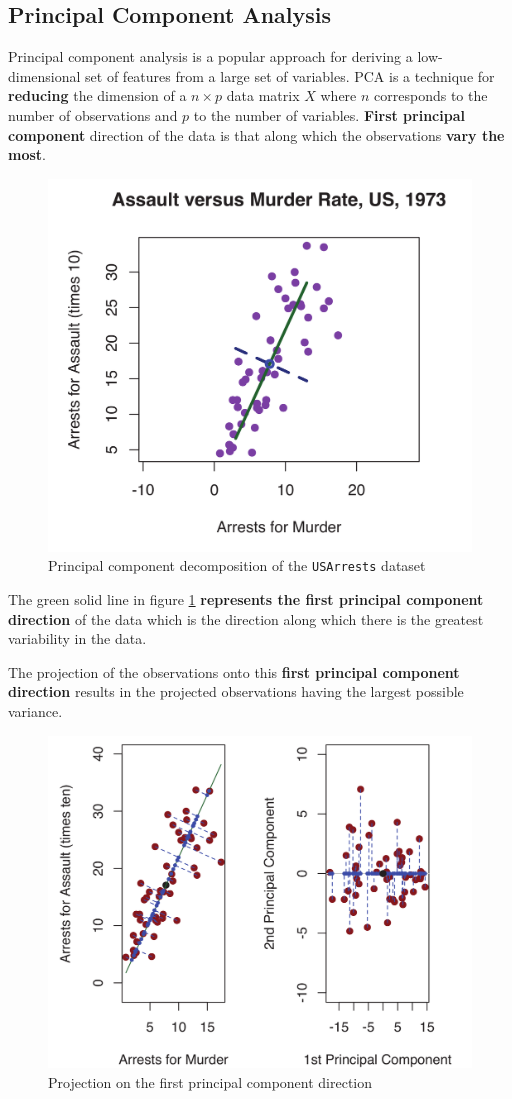 \documentclass[11pt]{article}
\newcommand*\predvar[1]{{\color{SeaGreen4} \texttt{#1}}}
\begin{document}
\subsection{Principal Component Analysis}
Principal component analysis is a popular approach for deriving a low-dimensional set of features from a large set of variables.
PCA is a technique for \textbf{reducing} the dimension of a $n \times p$ data matrix $X$ where $n$ corresponds to the number of observations and $p$ to the number of variables.
\textbf{First principal component} direction of the data is that along which the observations \textbf{vary the most}.

\begin{figure}[H]
	\centering
	\includegraphics[width=0.6\linewidth]{img/Principal_component_analysis}
	\caption{Principal component decomposition of the \predvar{USArrests} dataset}
	\label{fig:principalcomponentanalysis}
\end{figure}

The green solid line in figure \ref{fig:principalcomponentanalysis} \textbf{represents the first principal component direction} of the data which is the direction along which there is the greatest variability in the data.

The projection of the observations onto this \textbf{ first principal component direction} results in the projected observations having the largest possible variance.

\begin{figure}[H]
	\centering
	\includegraphics[width=0.6\linewidth]{img/Principal_component_analysis02}
	\caption{Projection on the first principal component direction}
	\label{fig:principalcomponentanalysis02}
\end{figure}
\end{document}
